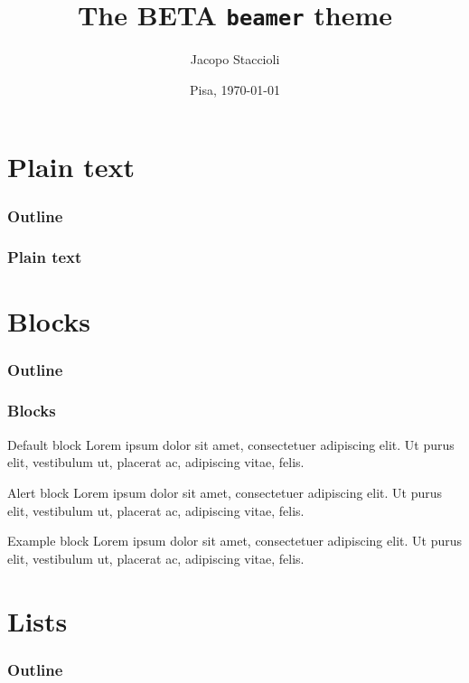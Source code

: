 \documentclass{beamer}
\title[The BETA \texttt{beamer} theme]{The BETA \texttt{beamer} theme}
\author[Jacopo Staccioli]{Jacopo Staccioli}
\institute{\href{mailto:j.staccioli@santannapisa.it}{\texttt{j.staccioli<at>santannapisa.it}}}
\date[\today]{Pisa, \today}
\begin{document}
\begin{frame}
\maketitle
\end{frame}

\section{\bfseries Plain text}

\begin{frame}
\frametitle{Outline}
\tableofcontents[currentsection]
\end{frame}

\begin{frame}
\frametitle{Plain text}
\lipsum[1]
\end{frame}

\section{\bfseries Blocks}

\begin{frame}
\frametitle{Outline}
\tableofcontents[currentsection]
\end{frame}

\begin{frame}
\frametitle{Blocks}
\begin{block}{Default block}
Lorem ipsum dolor sit amet, consectetuer adipiscing elit. Ut purus elit, vestibulum ut, placerat ac, adipiscing vitae, felis.
\end{block}
\begin{alertblock}{Alert block}
Lorem ipsum dolor sit amet, consectetuer adipiscing elit. Ut purus elit, vestibulum ut, placerat ac, adipiscing vitae, felis.
\end{alertblock}
\begin{exampleblock}{Example block}
Lorem ipsum dolor sit amet, consectetuer adipiscing elit. Ut purus elit, vestibulum ut, placerat ac, adipiscing vitae, felis.
\end{exampleblock}
\end{frame}

\section{\bfseries Lists}

\begin{frame}
\frametitle{Outline}
\tableofcontents[currentsection]
\end{frame}
\end{document}
